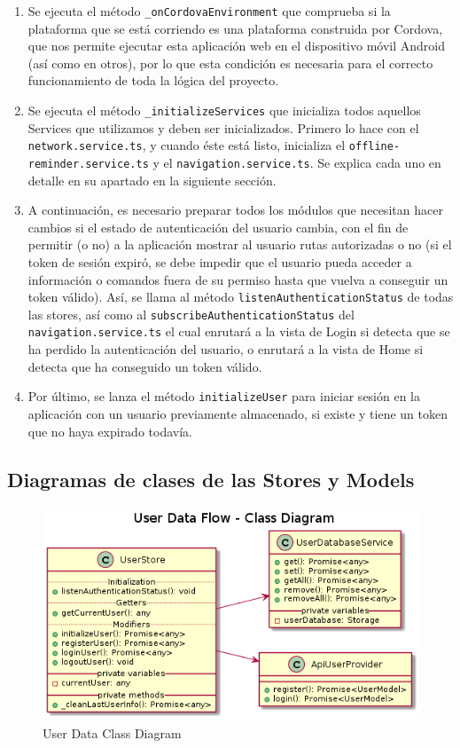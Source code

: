 \begin{enumerate}
\item Se ejecuta el método \verb|_onCordovaEnvironment| que comprueba si la plataforma que se está corriendo es una plataforma construida por Cordova, que nos permite ejecutar esta aplicación web en el dispositivo móvil Android (así como en otros), por lo que esta condición es necesaria para el correcto funcionamiento de toda la lógica del proyecto.
\item Se ejecuta el método \verb|_initializeServices| que inicializa todos aquellos Services que utilizamos y deben ser inicializados. Primero lo hace con el \verb|network.service.ts|, y cuando éste está listo, inicializa el \verb|offline-reminder.service.ts| y el \verb|navigation.service.ts|. Se explica cada uno en detalle en su apartado en la siguiente sección.
\item A continuación, es necesario preparar todos los módulos que necesitan hacer cambios si el estado de autenticación del usuario cambia, con el fin de permitir (o no) a la aplicación mostrar al usuario rutas autorizadas o no (si el token de sesión expiró, se debe impedir que el usuario pueda acceder a información o comandos fuera de su permiso hasta que vuelva a conseguir un token válido). Así, se llama al método \verb|listenAuthenticationStatus| de todas las stores, así como al \verb|subscribeAuthenticationStatus| del \verb|navigation.service.ts| el cual enrutará a la vista de Login si detecta que se ha perdido la autenticación del usuario, o enrutará a la vista de Home si detecta que ha conseguido un token válido.
\item Por último, se lanza el método \verb|initializeUser| para iniciar sesión en la aplicación con un usuario previamente almacenado, si existe y tiene un token que no haya expirado todavía.
\end{enumerate}

\subsection{Diagramas de clases de las Stores y Models}
\label{ch:Capitulo4.7.5}

\begin{figure}[hbt!]
\centering
\includegraphics[height=2.5in]{figures/diagrams/front/data-flow/user.png}
\caption[user]{User Data Class Diagram\footnotemark}
\end{figure}

